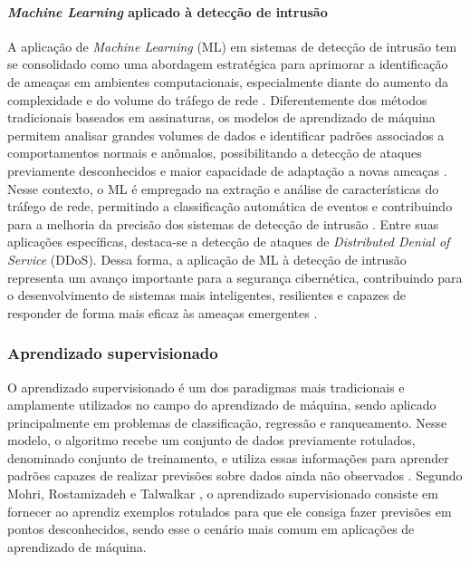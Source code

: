 \documentclass[
    12pt,                %
    openright,           %
    oneside,             %
    a4paper,             %
    english,             %
    brazil               %
]{abntex2}
\begin{document}
\paragraph{\textit{Machine Learning} aplicado à detecção de intrusão}

A aplicação de \textit{Machine Learning} (ML) em sistemas de detecção de intrusão tem se consolidado como uma abordagem estratégica para aprimorar a identificação de ameaças em ambientes computacionais, especialmente diante do aumento da complexidade e do volume do tráfego de rede \cite{gopalakrishnan2023}. Diferentemente dos métodos tradicionais baseados em assinaturas, os modelos de aprendizado de máquina permitem analisar grandes volumes de dados e identificar padrões associados a comportamentos normais e anômalos, possibilitando a detecção de ataques previamente desconhecidos e maior capacidade de adaptação a novas ameaças \cite{gopalakrishnan2023}. Nesse contexto, o ML é empregado na extração e análise de características do tráfego de rede, permitindo a classificação automática de eventos e contribuindo para a melhoria da precisão dos sistemas de detecção de intrusão \cite{gopalakrishnan2023}. Entre suas aplicações específicas, destaca-se a detecção de ataques de \textit{Distributed Denial of Service} (DDoS). Dessa forma, a aplicação de ML à detecção de intrusão representa um avanço importante para a segurança cibernética, contribuindo para o desenvolvimento de sistemas mais inteligentes, resilientes e capazes de responder de forma mais eficaz às ameaças emergentes \cite{gopalakrishnan2023,aktar2023}.

\subsubsection{Aprendizado supervisionado}

O aprendizado supervisionado é um dos paradigmas mais tradicionais e amplamente utilizados no campo do aprendizado de máquina, sendo aplicado principalmente em problemas de classificação, regressão e ranqueamento. Nesse modelo, o algoritmo recebe um conjunto de dados previamente rotulados, denominado conjunto de treinamento, e utiliza essas informações para aprender padrões capazes de realizar previsões sobre dados ainda não observados \cite{mohri2018}. Segundo Mohri, Rostamizadeh e Talwalkar \cite{mohri2018}, o aprendizado supervisionado consiste em fornecer ao aprendiz exemplos rotulados para que ele consiga fazer previsões em pontos desconhecidos, sendo esse o cenário mais comum em aplicações de aprendizado de máquina.
\end{document}
